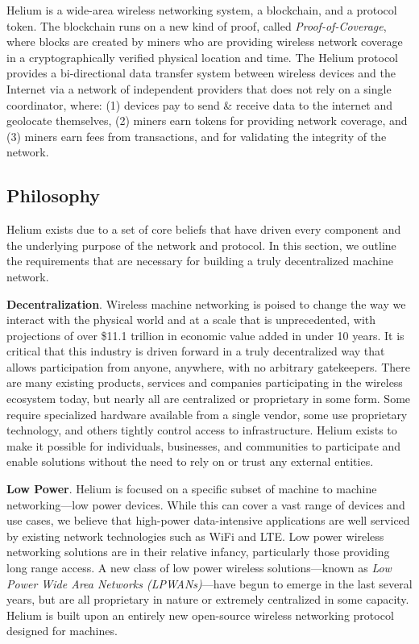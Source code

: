 \documentclass[10pt, nonatbib, nocopyrightspace, reprint]{sigplanconf}
\begin{document}
Helium is a wide-area wireless networking system, a blockchain, and a protocol token. The blockchain runs on a new kind of proof, called \emph{Proof-of-Coverage}, where blocks are created by miners who are providing wireless network coverage in a cryptographically verified physical location and time. The Helium protocol provides a bi-directional data transfer system between wireless devices and the Internet via a network of independent providers that does not rely on a single coordinator, where: (1) devices pay to send \& receive data to the internet and geolocate themselves, (2) miners earn tokens for providing network coverage, and (3) miners earn fees from transactions, and for validating the integrity of the network.

\subsection{Philosophy}

Helium exists due to a set of core beliefs that have driven every component and the underlying purpose of the network and protocol. In this section, we outline the requirements that are necessary for building a truly decentralized machine network.

\textbf{Decentralization}. Wireless machine networking is poised to change the way we interact with the physical world and at a scale that is unprecedented, with projections of over \$11.1 trillion in economic value added in under 10 years\cite{mckinsey}. It is critical that this industry is driven forward in a truly decentralized way that allows participation from anyone, anywhere, with no arbitrary gatekeepers. There are many existing products, services and companies participating in the wireless ecosystem today, but nearly all are centralized or proprietary in some form. Some require specialized hardware available from a single vendor, some use proprietary technology, and others tightly control access to infrastructure. Helium exists to make it possible for individuals, businesses, and communities to participate and enable solutions without the need to rely on or trust any external entities.

\textbf{Low Power}. Helium is focused on a specific subset of machine to machine networking---low power devices. While this can cover a vast range of devices and use cases, we believe that high-power data-intensive applications are well serviced by existing network technologies such as WiFi and LTE\@. Low power wireless networking solutions are in their relative infancy, particularly those providing long range access. A new class of low power wireless solutions---known as \emph{Low Power Wide Area Networks (LPWANs)}---have begun to emerge in the last several years, but are all proprietary in nature or extremely centralized in some capacity. Helium is built upon an entirely new open-source wireless networking protocol designed for machines.
\end{document}
